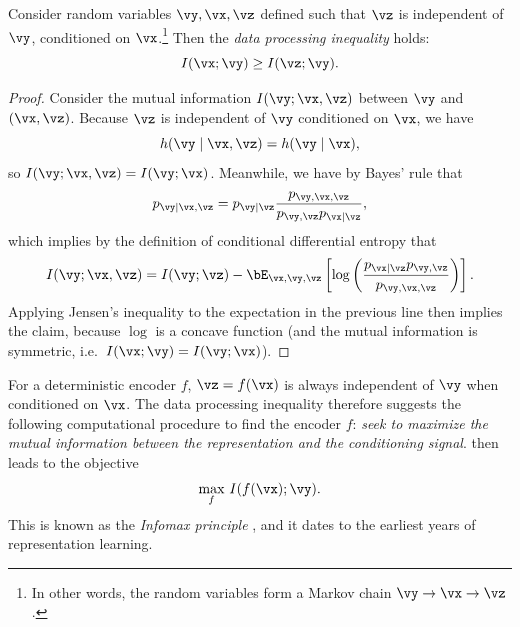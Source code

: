 \documentclass[../../book-main.tex]{subfiles}
\begin{document}
\begin{theorem}\label{thm:dpi}
    Consider random variables $\vy, \vx, \vz$ defined such that $\vz$ is
    independent of $\vy$, conditioned on $\vx$.\footnote{In other words, the
    random variables form a Markov chain $\vy \to \vx \to \vz$.} Then the
    \textit{data processing inequality} holds:
    \begin{equation}\label{eq:dpi-ch7}
        I(\vx; \vy) \geq I(\vz; \vy).
    \end{equation}
    \begin{proof}
        Consider the mutual information $I(\vy; \vx, \vz)$ between $\vy$ and
        $(\vx, \vz)$. Because $\vz$ is independent of $\vy$ conditioned on
        $\vx$, we have
        \begin{equation*}
            h(\vy \mid \vx, \vz) = h(\vy \mid \vx),
        \end{equation*}
        so $I(\vy; \vx, \vz) = I(\vy; \vx)$. Meanwhile, we have by Bayes' rule
        that
        \begin{equation*}
            p_{\vy \mid \vx, \vz} = p_{\vy \mid \vz}
            \frac{p_{\vy, \vx, \vz}}{p_{\vy, \vz} p_{\vx \mid \vz}},
        \end{equation*}
        which implies by the definition of conditional differential entropy that
        \begin{equation*}
            I(\vy; \vx, \vz) =
            I(\vy; \vz)
            - \bE_{\vx, \vy, \vz}\left[ \log \left(
                    \frac{p_{\vx \mid \vz} p_{\vy, \vz}}{p_{\vy, \vx, \vz}}
            \right)\right].
        \end{equation*}
        Applying Jensen's inequality to the expectation in the previous line
        then implies the claim, because $\log$ is a concave function (and the
        mutual information is symmetric, i.e.\ $I(\vx; \vy) = I(\vy; \vx)$).
    \end{proof}
\end{theorem}

For a deterministic encoder $f$, $\vz = f(\vx)$ is always independent of $\vy$
when conditioned on $\vx$.
The data processing inequality therefore suggests the following computational
procedure to find the encoder $f$: \textit{seek to maximize the mutual
information between the representation and the conditioning signal}.
 then leads to the objective
\begin{equation}\label{eq:infomax-x}
    \max_{f}\, I(f(\vx); \vy).
\end{equation}
This is known as the \textit{Infomax principle} \cite{infomax}, and
it dates to the
earliest years of representation learning.
\end{document}
